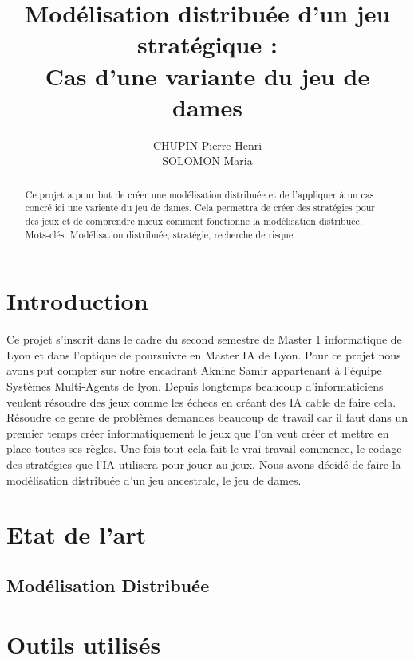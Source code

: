 \documentclass[11pt]{article} %
\title{Modélisation distribuée d’un jeu stratégique : 
 \\ Cas d'une variante du jeu de dames}
\author{CHUPIN Pierre-Henri \\ SOLOMON Maria}
\date{} %
\begin{document}
\maketitle

\begin{abstract}
Ce  projet  a  pour  but  de  créer  une modélisation distribuée et de l'appliquer à un cas concré ici une variente du jeu de dames. Cela permettra de créer des stratégies pour des jeux et de comprendre mieux comment fonctionne la modélisation distribuée. \\
Mots-clés: Modélisation distribuée, stratégie, recherche de risque
\end{abstract}
\section{Introduction}
Ce projet s'inscrit dans le cadre du second semestre de Master 1 informatique de Lyon et dans l'optique de poursuivre en Master IA de Lyon. Pour ce projet nous avons put compter sur notre encadrant Aknine Samir appartenant à l'équipe Systèmes Multi-Agents de lyon. Depuis longtemps beaucoup d'informaticiens veulent résoudre des jeux comme les échecs en créant des IA cable de faire cela. Résoudre ce genre de problèmes demandes beaucoup de travail car il faut dans un premier temps créer informatiquement le jeux que l’on veut créer et mettre en place toutes ses règles. Une fois tout cela fait le vrai travail commence, le codage des stratégies que l’IA utilisera pour jouer au jeux. Nous avons décidé de faire la modélisation distribuée d'un jeu ancestrale, le jeu de dames. 

\section{Etat de l'art}

\subsection{Modélisation Distribuée}

\section{Outils utilisés}
\end{document}
